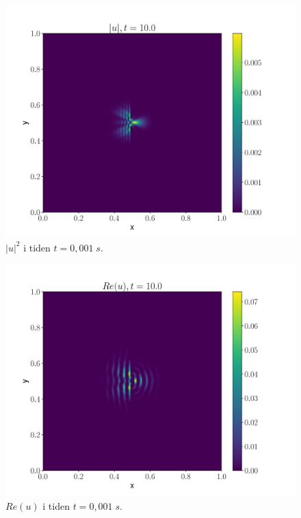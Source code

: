 \documentclass[reprint,english,notitlepage]{revtex4-2}  %
\begin{document}
\begin{figure}[H]
\centering
\includegraphics[scale=0.45, trim={3cm 0 0 0}]{../Images/ImshowUt0001sl1.pdf}
\caption{$|u|^2 $ i tiden $t = 0,001 \; s$.}
\label{Fig:s2u2t01}
\end{figure}

\begin{figure}[H]
\centering
\includegraphics[scale=0.45, trim={3cm 0 0 0}]{../Images/ImshowRe0001sl1.pdf}
\caption{$Re(u) $ i tiden $t = 0,001 \; s$.}
\label{Fig:s2Ret01}
\end{figure}
\end{document}
